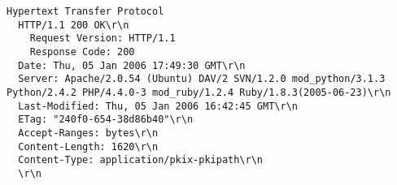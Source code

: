\begin{lstlisting}[caption={Início (cabeçalho) da resposta HTTP enviada pelo servidor para a aplicação \texttt{s\_server}}]
Hypertext Transfer Protocol 
  HTTP/1.1 200 OK\r\n 
    Request Version: HTTP/1.1 
    Response Code: 200 
  Date: Thu, 05 Jan 2006 17:49:30 GMT\r\n 
  Server: Apache/2.0.54 (Ubuntu) DAV/2 SVN/1.2.0 mod_python/3.1.3 Python/2.4.2 PHP/4.4.0-3 mod_ruby/1.2.4 Ruby/1.8.3(2005-06-23)\r\n 
  Last-Modified: Thu, 05 Jan 2006 16:42:45 GMT\r\n 
  ETag: "240f0-654-38d86b40"\r\n 
  Accept-Ranges: bytes\r\n 
  Content-Length: 1620\r\n 
  Content-Type: application/pkix-pkipath\r\n 
  \r\n
\end{lstlisting}

